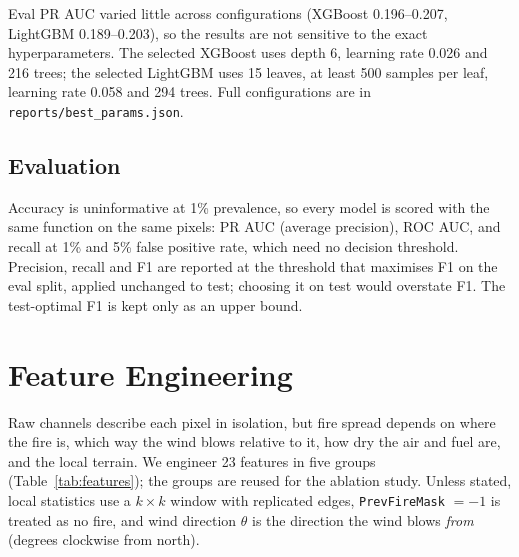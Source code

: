 Eval PR AUC varied little across configurations (XGBoost 0.196--0.207, LightGBM 0.189--0.203),
so the results are not sensitive to the exact hyperparameters. The selected XGBoost uses depth 6,
learning rate 0.026 and 216 trees; the selected LightGBM uses 15 leaves, at least 500 samples
per leaf, learning rate 0.058 and 294 trees. Full configurations are in
\texttt{reports/best\_params.json}.

\subsection{Evaluation}
Accuracy is uninformative at 1\% prevalence, so every model is scored with the same function on
the same pixels: PR AUC (average precision), ROC AUC, and recall at 1\% and 5\% false positive
rate, which need no decision threshold. Precision, recall and F1 are reported at the threshold
that maximises F1 on the eval split, applied unchanged to test; choosing it on test would
overstate F1. The test-optimal F1 is kept only as an upper bound.

\section{Feature Engineering}
\label{sec:features}
Raw channels describe each pixel in isolation, but fire spread depends on where the fire is,
which way the wind blows relative to it, how dry the air and fuel are, and the local terrain.
We engineer 23 features in five groups (Table~\ref{tab:features}); the groups are reused for the
ablation study. Unless stated, local statistics use a $k\times k$ window with replicated edges,
\texttt{PrevFireMask} $=-1$ is treated as no fire, and wind direction $\theta$ is the direction
the wind blows \emph{from} (degrees clockwise from north).


